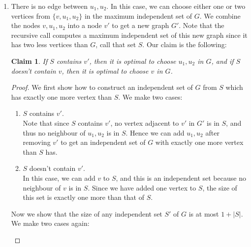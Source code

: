 \documentclass[answers]{exam}
\newtheorem{claim}{Claim}
\newcommand{\nl}{\vspace{0.2cm}\\}
\begin{document}
\begin{questions}
\begin{solution}
\begin{enumerate}
\begin{enumerate}
                adding in $v$, and if we choose two or more, the set is no longer independent). By the claim, it is optimal to choose $v$, and the remaining set must come from $G \setminus \{v,
                u_1, u_2\}$. Using a completely analogous argument as in the degree 1 case, we can show that the union of the chosen vertex (which is $v$) and the answer of the recursive call is a
                maximum independent set of the graph.
            \item There is no edge between $u_1, u_2$. In this case, we can choose either one or two vertices from $\{v, u_1, u_2\}$ in the maximum independent set of $G$. We combine the nodes $v,
                u_1, u_2$ into a node $v'$ to get a new graph $G'$. Note that the recursive call computes a maximum independent set of this new graph since it has two less vertices than $G$, call that set $S$.
                Our claim is the following:
                \begin{claim}
                    If $S$ contains $v'$, then it is optimal to choose $u_1, u_2$ in $G$, and if $S$ doesn't contain $v$, then it is optimal to choose $v$ in $G$.
                \end{claim}
                \begin{proof}
                We first show how to construct an independent set of $G$ from $S$ which has exactly one more vertex than $S$.
                We make two cases:
                    \begin{enumerate}
                        \item $S$ contains $v'$.\nl
                            Note that since $S$ contains $v'$, no vertex adjacent to $v'$ in $G'$ is in $S$, and thus no neighbour of $u_1, u_2$ is in $S$. Hence we can add $u_1, u_2$ after removing
                            $v'$ to get an independent set of $G$ with exactly one more vertex than $S$ has.
                        \item $S$ doesn't contain $v'$.\nl
                            In this case, we can add $v$ to $S$, and this is an independent set because no neighbour of $v$ is in $S$. Since we have added one vertex to $S$, the size of this set
                            is exactly one more than that of $S$.
                    \end{enumerate}
                Now we show that the size of any independent set $S'$ of $G$ is at most $1 + |S|$.
                We make two cases again:
                    \begin{enumerate}

\end{enumerate}
\end{proof}
\end{enumerate}
\end{enumerate}
\end{solution}
\end{questions}
\end{document}
